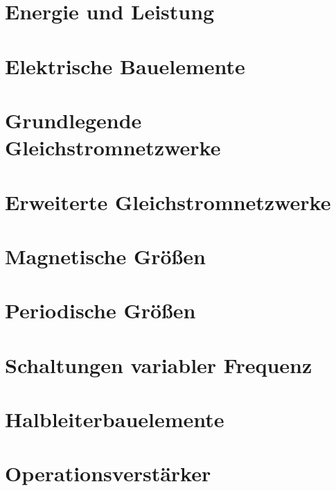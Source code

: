 \documentclass[twoside, a4paper]{article}
\begin{document}
\cleardoublepage
\part{Energie und Leistung}

\cleardoublepage
\part{Elektrische Bauelemente}

\cleardoublepage
\part{Grundlegende Gleichstromnetzwerke}

\cleardoublepage
\part{Erweiterte Gleichstromnetzwerke}

\cleardoublepage
\part{Magnetische Größen}

\cleardoublepage
\part{Periodische Größen}

\cleardoublepage
\part{Schaltungen variabler Frequenz}

\cleardoublepage
\part{Halbleiterbauelemente}

\cleardoublepage
\part{Operationsverstärker}
\end{document}
